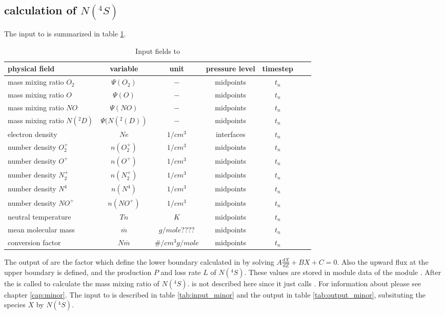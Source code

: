 \subsection{calculation of $N(^4S)$}\label{subcap:comp_n4s}
%
The input to  is summarized in table
\ref{tab:input_comp_n4s}.
%
\begin{table}[tb]
\begin{tabular}{|p{3.5cm} ||c|c|c|c|c|c|} \hline
physical field               & variable        & unit&pressure
level& timestep
\\ \hline \hline
%
mass mixing ratio $O_2$ &       $\Psi(O_2)$              & $-$   &  midpoints & $t_n$\\
mass mixing ratio $O$ &         $\Psi(O  )$              & $-$   &  midpoints & $t_n$\\
mass mixing ratio $NO$ &       $\Psi(NO)$              & $-$   &  midpoints & $t_n$\\
mass mixing ratio $N(^2D)$ &       $\Psi(N(^2(D))$              & $-$   &  midpoints & $t_n$\\
electron density&       $Ne$              & $1/cm^3$   &  interfaces & $t_n$\\
number density $O_2^+$&       $n(O_2^+)$              & $1/cm^3$   &  midpoints & $t_n$\\
number density $O^+$&       $n(O^+)$              & $1/cm^3$   &  midpoints & $t_n$\\
number density $N_2^+$&       $n(N_2^+)$              & $1/cm^3$   &  midpoints & $t_n$\\
number density $N^4$&       $n(N^4)$              & $1/cm^3$   &  midpoints & $t_n$\\
number density $NO^+$&       $n(NO^+)$              & $1/cm^3$   &  midpoints & $t_n$\\
neutral temperature&       $Tn$              & $K$   &  midpoints & $t_n$\\
mean molecular mass&       $\overline{m}$              & $g/mole????$   &  midpoints & $t_n$\\
conversion factor&       $N \overline{m}$              & $\#/cm^3
g/mole$   &  midpoints & $t_n$
 \\ \hline
\end{tabular}
\caption{Input fields to }
\label{tab:input_comp_n4s}
\end{table}
%
The output of  are the factor which define
the lower boundary calculated in  by solving
$A\frac{d X}{dZ} + B X + C = 0$. Also the upward flux at the upper
boundary is defined, and the production $P$ and loss rate $L$ of
$N(^4S)$. These values are stored in module data of the module
. After  the
 is called to calculate the mass mixing
ratio of $N(^4S)$.  is not described here
since it just calls . For information about
 please see chapter \ref{cap:minor}. The input
to  is described in table
\ref{tab:input_minor} and the output in table
\ref{tab:output_minor}, subsituting the species $X$ by $N(^4S)$. \\

